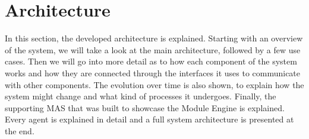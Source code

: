 











\glsresetall


\chapter{Architecture}
\label{cha:architecture}

In this section, the developed architecture is explained. Starting with an overview of the system, we will take a look at the main architecture, followed by a few use cases. Then we will go into more detail as to how each component of the system works and how they are connected through the interfaces it uses to communicate with other components. The evolution over time is also shown, to explain how the system might change and what kind of processes it undergoes. Finally, the supporting \acrlong{MAS} that was built to showcase the Module Engine is explained. Every agent is explained in detail and a full system architecture is presented at the end.

